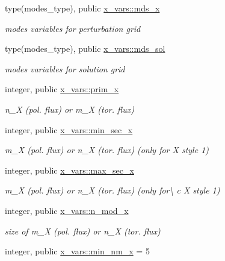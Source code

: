 \begin{DoxyCompactItemize}
\item 
type(modes\+\_\+type), public \hyperlink{namespacex__vars_a690d4228d2a81ec5a7a6cd13be3a56a1}{x\+\_\+vars\+::mds\+\_\+x}
\begin{DoxyCompactList}\small\item\em modes variables for perturbation grid \end{DoxyCompactList}\item 
type(modes\+\_\+type), public \hyperlink{namespacex__vars_ac74f59668de6caca7038decc7191c6a1}{x\+\_\+vars\+::mds\+\_\+sol}
\begin{DoxyCompactList}\small\item\em modes variables for solution grid \end{DoxyCompactList}\item 
integer, public \hyperlink{namespacex__vars_ae7f7061534fb3ad68a538cdcea20d1d9}{x\+\_\+vars\+::prim\+\_\+x}
\begin{DoxyCompactList}\small\item\em {\ttfamily n\+\_\+X} (pol. flux) or {\ttfamily m\+\_\+X} (tor. flux) \end{DoxyCompactList}\item 
integer, public \hyperlink{namespacex__vars_a0d63825aabc4c71623c6ea7ffe033949}{x\+\_\+vars\+::min\+\_\+sec\+\_\+x}
\begin{DoxyCompactList}\small\item\em {\ttfamily m\+\_\+X} (pol. flux) or {\ttfamily n\+\_\+X} (tor. flux) (only for {\ttfamily X} style 1) \end{DoxyCompactList}\item 
integer, public \hyperlink{namespacex__vars_ae19ca528c5688228ff20912a45290b2a}{x\+\_\+vars\+::max\+\_\+sec\+\_\+x}
\begin{DoxyCompactList}\small\item\em {\ttfamily m\+\_\+X} (pol. flux) or {\ttfamily n\+\_\+X} (tor. flux) (only for\textbackslash{} c X style 1) \end{DoxyCompactList}\item 
integer, public \hyperlink{namespacex__vars_a2e8fe6c5fe1cf61704bf176925d2b02e}{x\+\_\+vars\+::n\+\_\+mod\+\_\+x}
\begin{DoxyCompactList}\small\item\em size of {\ttfamily m\+\_\+X} (pol. flux) or {\ttfamily n\+\_\+X} (tor. flux) \end{DoxyCompactList}\item 
integer, public \hyperlink{namespacex__vars_adec89f548ba63e203297222dce675b94}{x\+\_\+vars\+::min\+\_\+nm\+\_\+x} = 5

\end{DoxyCompactItemize}

